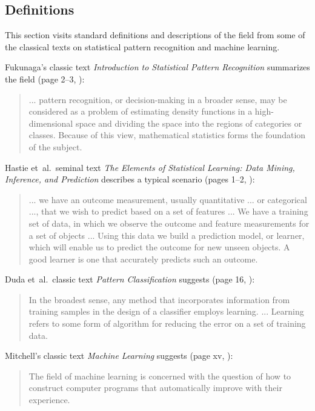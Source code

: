 \documentclass[a4paper, 11pt]{article}
\begin{document}
\subsection{Definitions}
\label{subsec:definitions}
This section visits standard definitions and descriptions of the field from some of the classical texts on statistical pattern recognition and machine learning. 

Fukunaga's classic text \emph{Introduction to Statistical Pattern Recognition} summarizes the field (page 2--3, \cite{Fukunaga1990}):

\begin{quotation}
... pattern recognition, or decision-making in a broader sense, may be considered as a problem of estimating density functions in a high-dimensional space and dividing the space into the regions of categories or classes. Because of this view, mathematical statistics forms the foundation of the subject.
\end{quotation} 

Hastie et~al.\ seminal text \emph{The Elements of Statistical Learning: Data Mining, Inference, and Prediction} describes a typical scenario (pages 1--2, \cite{Hastie2009}):

\begin{quotation}
... we have an outcome measurement, usually quantitative ... or categorical ..., that we wish to predict based on a set of features ... We have a training set of data, in which we observe the outcome and feature measurements for a set of objects ... Using this data we build a prediction model, or learner, which will enable us to predict the outcome for new unseen objects. A good learner is one that accurately predicts such an outcome.
\end{quotation} 

Duda et~al.\ classic text \emph{Pattern Classification} suggests (page 16, \cite{Duda2001}):

\begin{quotation}
In the broadest sense, any method that incorporates information from training samples in the design of a classifier employs learning. ... Learning refers to some form of algorithm for reducing the error on a set of training data.
\end{quotation}

Mitchell's classic text \emph{Machine Learning} suggests (page xv, \cite{Mitchell1997}):

\begin{quotation}
The field of machine learning is concerned with the question of how to construct computer programs that automatically improve with their experience.
\end{quotation}
\end{document}
